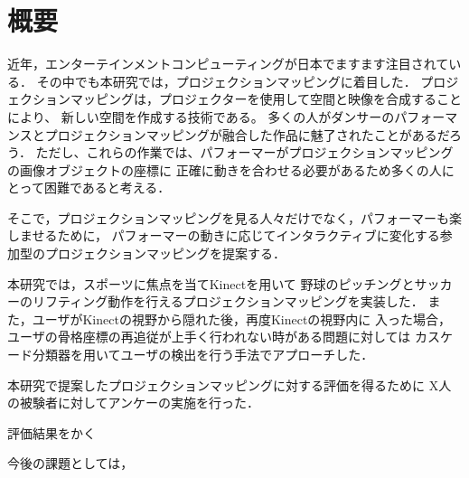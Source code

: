 \chapter*{概要}

近年，エンターテインメントコンピューティングが日本でますます注目されている．
その中でも本研究では，プロジェクションマッピングに着目した．
プロジェクションマッピングは，プロジェクターを使用して空間と映像を合成することにより、
新しい空間を作成する技術である。
多くの人がダンサーのパフォーマンスとプロジェクションマッピングが融合した作品に魅了されたことがあるだろう．
ただし、これらの作業では、パフォーマーがプロジェクションマッピングの画像オブジェクトの座標に
正確に動きを合わせる必要があるため多くの人にとって困難であると考える．

そこで，プロジェクションマッピングを見る人々だけでなく，パフォーマーも楽しませるために，
パフォーマーの動きに応じてインタラクティブに変化する参加型のプロジェクションマッピングを提案する．

本研究では，スポーツに焦点を当てKinectを用いて
野球のピッチングとサッカーのリフティング動作を行えるプロジェクションマッピングを実装した．
また，ユーザがKinectの視野から隠れた後，再度Kinectの視野内に
入った場合，ユーザの骨格座標の再追従が上手く行われない時がある問題に対しては
カスケード分類器を用いてユーザの検出を行う手法でアプローチした．

本研究で提案したプロジェクションマッピングに対する評価を得るために
X人の被験者に対してアンケーの実施を行った．

評価結果をかく

今後の課題としては，

